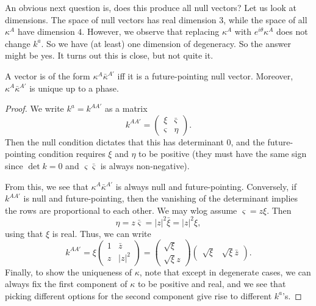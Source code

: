 \documentclass[a4paper]{article}
\begin{document}
An obvious next question is, does this produce all null vectors? Let us look at dimensions. The space of null vectors has real dimension $3$, while the space of all $\kappa^A$ have dimension $4$. However, we observe that replacing $\kappa^A$ with $e^{i\theta} \kappa^A$ does not change $k^a$. So we have (at least) one dimension of degeneracy. So the answer might be yes. It turns out this is close, but not quite it.

\begin{lemma}
  A vector is of the form $\kappa^A \bar{\kappa}^{A'}$ iff it is a future-pointing null vector. Moreover, $\kappa^A \bar{\kappa}^{A'}$ is unique up to a phase.
\end{lemma}

\begin{proof}
  We write $k^a = k^{AA'}$ as a matrix
  \[
    k^{AA'} =
    \begin{pmatrix}
      \xi & \bar{\varsigma}\\
      \varsigma & \eta
    \end{pmatrix}.
  \]
  Then the null condition dictates that this has determinant $0$, and the future-pointing condition requires $\xi$ and $\eta$ to be positive (they must have the same sign since $\det k = 0$ and $\varsigma \bar\varsigma$ is always non-negative).

  From this, we see that $\kappa^A \bar{\kappa}^{A'}$ is always null and future-pointing. Conversely, if $k^{AA'}$ is null and future-pointing, then the vanishing of the determinant implies the rows are proportional to each other. We may wlog assume $\varsigma = z \xi$. Then
  \[
    \eta = z \bar{\varsigma} = |z|^2 \bar{\xi} = |z|^2 \xi,
  \]
  using that $\xi$ is real. Thus, we can write
  \[
    k^{AA'} = \xi
    \begin{pmatrix}
      1 & \bar{z}\\
      z & |z|^2
    \end{pmatrix} =
    \begin{pmatrix}
      \sqrt{\xi}\\ \sqrt{\xi} z
    \end{pmatrix}
    \begin{pmatrix}
      \sqrt{\xi} & \sqrt{\xi}\bar{z}
    \end{pmatrix}.
  \]
  Finally, to show the uniqueness of $\kappa$, note that except in degenerate cases, we can always fix the first component of $\kappa$ to be positive and real, and we see that picking different options for the second component give rise to different $k^a$'s.
\end{proof}
\end{document}
